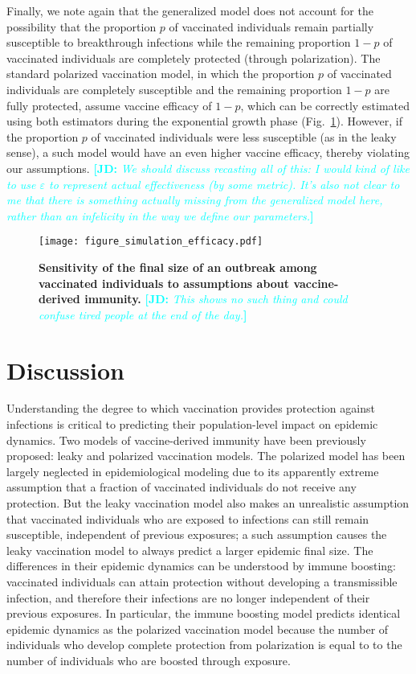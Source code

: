 \documentclass[12pt]{article}
\newcommand{\comment}{\showcomment}
\newcommand{\showcomment}[3]{\textcolor{#1}{\textbf{[#2: }\textsl{#3}\textbf{]}}}
\newcommand{\jd}[1]{\comment{cyan}{JD}{#1}}
\newcommand{\fref}[1]{Fig.~\ref{fig:#1}}
\begin{document}
Finally, we note again that the generalized model does not account for the possibility that the proportion $p$ of vaccinated individuals remain partially susceptible to breakthrough infections while the remaining proportion $1-p$ of vaccinated individuals are completely protected (through polarization).
The standard polarized vaccination model, in which the proportion $p$ of vaccinated individuals are completely susceptible and the remaining proportion $1-p$ are fully protected, assume vaccine efficacy of $1-p$, which can be correctly estimated using both estimators during the exponential growth phase (\fref{efficacy}).
However, if the proportion $p$ of vaccinated individuals were less susceptible (as in the leaky sense), a such model would have an even higher vaccine efficacy, thereby violating our assumptions.
\jd{We should discuss recasting all of this: I would kind of like to use $\varepsilon$ to represent actual effectiveness (by some metric). It's also not clear to me that there is something actually missing from the generalized model here, rather than an infelicity in the way we define our parameters.}

\begin{figure}[!th]
\texttt{[image: figure\_simulation\_efficacy.pdf]}
\caption{
\textbf{Sensitivity of the final size of an outbreak among vaccinated individuals to assumptions about vaccine-derived immunity.}
\jd{This shows no such thing and could confuse tired people at the end of the day.}
\label{fig:efficacy}
}
\end{figure}

\section*{Discussion}

Understanding the degree to which vaccination provides protection against infections is critical to predicting their population-level impact on epidemic dynamics.
Two models of vaccine-derived immunity have been previously proposed: leaky and polarized vaccination models.
The polarized model has been largely neglected in epidemiological modeling due to its apparently extreme assumption that a fraction of vaccinated individuals do not receive any protection. 
But the leaky vaccination model also makes an unrealistic assumption that vaccinated individuals who are exposed to infections can still remain susceptible, independent of previous exposures; 
a such assumption causes the leaky vaccination model to always predict a larger epidemic final size.
The differences in their epidemic dynamics can be understood by immune boosting: vaccinated individuals can attain protection without developing a transmissible infection, and therefore their infections are no longer independent of their previous exposures.
In particular, the immune boosting model predicts identical epidemic dynamics as the polarized vaccination model because the number of individuals who develop complete protection from polarization is equal to to the number of individuals who are boosted through exposure.
\end{document}

